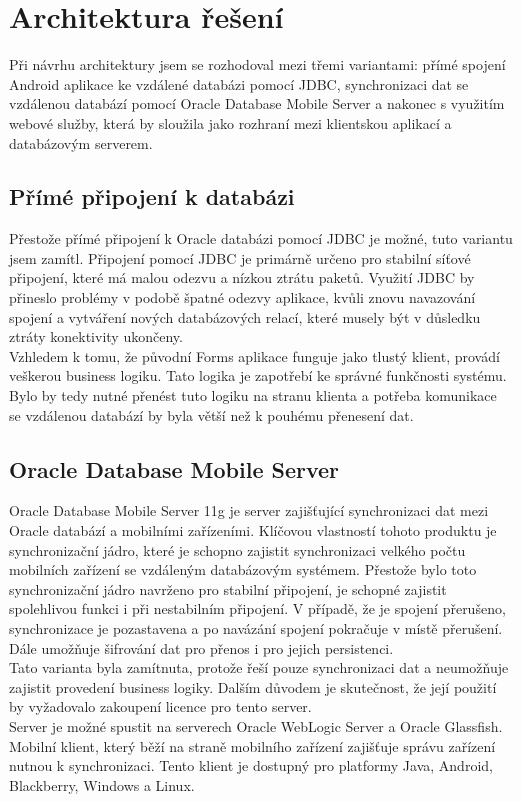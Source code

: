 \documentclass{diplomka}
\begin{document}
\section{Architektura řešení}
\label{sec:architecture}
Při návrhu architektury jsem se rozhodoval mezi třemi variantami: přímé spojení Android aplikace ke vzdálené databázi pomocí JDBC, synchronizaci dat se vzdálenou databází pomocí Oracle Database Mobile Server a nakonec s využitím webové služby, která by sloužila jako rozhraní mezi klientskou aplikací a databázovým serverem.

\subsection{Přímé připojení k databázi}
Přestože přímé připojení k Oracle databázi pomocí JDBC je možné, tuto variantu jsem zamítl. Připojení pomocí JDBC je primárně určeno pro stabilní síťové připojení, které má malou odezvu a nízkou ztrátu paketů. Využití JDBC by přineslo problémy v podobě špatné odezvy aplikace, kvůli znovu navazování spojení a vytváření nových databázových relací, které musely být v důsledku ztráty konektivity ukončeny.\\ \indent
Vzhledem k tomu, že původní Forms aplikace funguje jako tlustý klient, provádí veškerou business logiku. Tato logika je zapotřebí ke správné funkčnosti systému. Bylo by tedy nutné přenést tuto logiku na stranu klienta a potřeba komunikace se vzdálenou databází by byla větší než k pouhému přenesení dat.

\subsection{Oracle Database Mobile Server}
Oracle Database Mobile Server 11g\cite{mobile} je server zajišťující  synchronizaci dat mezi Oracle databází a mobilními zařízeními. Klíčovou vlastností tohoto produktu je synchronizační jádro, které je schopno zajistit synchronizaci velkého počtu mobilních zařízení se vzdáleným databázovým systémem. Přestože bylo toto synchronizační jádro navrženo pro stabilní připojení, je schopné zajistit spolehlivou funkci i při nestabilním připojení. V případě, že je spojení přerušeno, synchronizace je pozastavena a po navázání spojení pokračuje v místě přerušení. Dále umožňuje šifrování dat pro přenos i pro jejich persistenci.\\ \indent
Tato varianta byla zamítnuta, protože řeší pouze synchronizaci dat a neumožňuje zajistit provedení business logiky. Dalším důvodem je skutečnost, že její použití by vyžadovalo zakoupení licence pro tento server.\\ \indent
Server je možné spustit na serverech Oracle WebLogic Server a Oracle Glassfish. Mobilní klient, který běží na straně mobilního zařízení zajišťuje správu zařízení nutnou k synchronizaci. Tento klient je dostupný pro platformy Java, Android, Blackberry, Windows a Linux.
\end{document}
